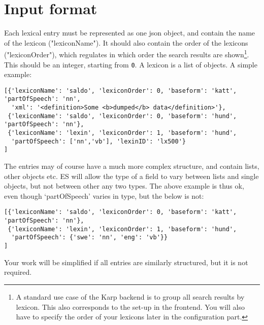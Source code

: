 \documentclass[
12pt, %
a4paper, %
oneside, %
headinclude,footinclude, %
BCOR0mm, %
]{scrartcl}
\begin{document}
\section{Input format}
Each lexical entry must be represented as one json object, and contain the name of the lexicon ("lexiconName").
It should also contain the order of the lexicons ("lexiconOrder"), which regulates in which order the search results
are shown\footnote{A standard use case of the Karp backend is to group all search results by lexicon. This
  also corresponds to the set-up in the frontend. You will also have to specify the order of your lexicons
later in the configuration part.}. This should be an integer, starting from \verb|0|.
A lexicon is a list of objects.
A simple example:
{\footnotesize
\begin{verbatim}
[{'lexiconName': 'saldo', 'lexiconOrder': 0, 'baseform': 'katt', 'partOfSpeech': 'nn',
  'xml': '<definition>Some <b>dumped</b> data</definition>'},
 {'lexiconName': 'saldo', 'lexiconOrder': 0, 'baseform': 'hund', 'partOfSpeech': 'nn'},
 {'lexiconName': 'lexin', 'lexiconOrder': 1, 'baseform': 'hund',
  'partOfSpeech': ['nn','vb'], 'lexinID': 'lx500'}
]
\end{verbatim}}
The entries may of course have a much more complex structure, and contain lists, other objects etc.
ES will allow the type of a field to vary between lists and single objects, but not between other any two types.
The above example is thus ok, even though `partOfSpeech' varies in type, but the below is not:
{\footnotesize
\begin{verbatim}
[{'lexiconName': 'saldo', 'lexiconOrder': 0, 'baseform': 'katt', 'partOfSpeech': 'nn'},
 {'lexiconName': 'lexin', 'lexiconOrder': 1, 'baseform': 'hund',
  'partOfSpeech': {'swe': 'nn', 'eng': 'vb'}}
]
\end{verbatim}}
Your work will be simplified if all entries are similarly structured, but it is not required.
\end{document}
